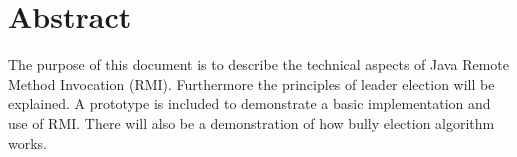 \chapter*{Abstract}

The purpose of this document is to describe the technical aspects of Java  Remote Method Invocation (RMI). Furthermore the principles of leader election will be explained. 
A prototype is included to demonstrate a basic implementation and use of RMI. There will also be a demonstration of how bully election algorithm works.

